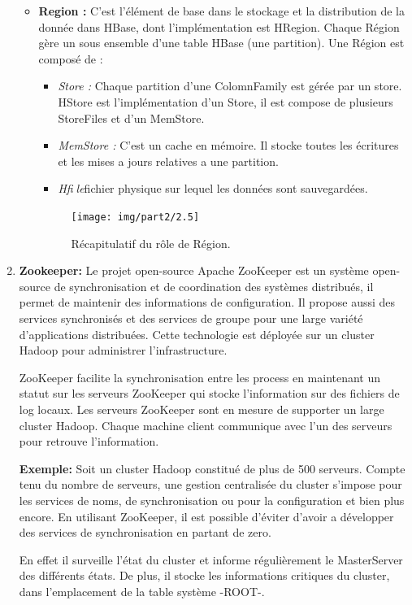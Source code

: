 \begin{enumerate}[label=\protect\ding{\value*}, start=182]
\begin{itemize}[label=\textbullet]
\item \textbf{Region :} C'est l'élément de base dans le stockage et la distribution de la donnée dans HBase, dont l'implémentation est HRegion. Chaque Région gère un sous ensemble d'une table HBase (une partition). Une Région est composé de :
	\begin{itemize}
	\item \textit{Store :} Chaque partition d'une ColomnFamily est gérée par un store.
	HStore est l'implémentation d'un Store, il est compose de plusieurs StoreFiles
	et d'un MemStore.
	\item \textit{MemStore :} C'est un cache en mémoire. Il stocke toutes les écritures et les mises a 			jours relatives a une partition.
	\item \textit{Hfile}fichier physique sur lequel les données sont sauvegardées.
	\end{itemize}
	
	\begin{figure}[h]
	\centering
    \texttt{[image: img/part2/2.5]}
    \caption{Récapitulatif du rôle de Région.}
	\end{figure}
\end{itemize}

\item \textbf{Zookeeper:}
Le projet open-source Apache ZooKeeper est un système open-source de synchronisation et de coordination des systèmes distribués, il permet de maintenir des informations de configuration. Il propose aussi des services synchronisés et des services de groupe pour une large variété d'applications distribuées. Cette technologie est déployée sur un cluster Hadoop pour administrer l'infrastructure. 

ZooKeeper facilite la synchronisation entre les process en maintenant un statut sur les serveurs ZooKeeper qui stocke l'information sur des fichiers de log locaux. Les serveurs ZooKeeper sont en mesure de supporter un large cluster Hadoop. Chaque machine client communique avec l'un des serveurs pour retrouve l'information.

\textbf{Exemple:} Soit un cluster Hadoop constitué de plus de 500 serveurs. Compte tenu du nombre de serveurs, une gestion centralisée du cluster s'impose pour les services de noms, de synchronisation ou pour la configuration et bien plus encore. En utilisant ZooKeeper, il est possible d'éviter d'avoir a développer des services de synchronisation en partant de zero. 

En effet il surveille l'état du cluster et informe régulièrement le MasterServer
des différents états. De plus, il stocke les informations critiques du cluster, dans l'emplacement de la table système -ROOT-.


\end{enumerate}
